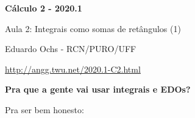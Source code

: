 \documentclass[oneside,12pt]{article}
\begin{document}

\long{}
\long{}
\long{}
\long{}
\long{}
\long{}
\long{}
\long{}
\long{}
\long{}

\long{}
\long{}

\def\frown{\ensuremath{{=}{(}}}
\def\True {\mathbf{V}}
\def\False{\mathbf{F}}
\def\D    {\displaystyle}

\def\drafturl{http://angg.twu.net/LATEX/2020-1-C2.pdf}
\def\drafturl{http://angg.twu.net/2020.1-C2.html}
\def\draftfooter{\tiny \href{\drafturl}{\jobname{}} \ColorBrown{\shorttoday{} \hours}}



%

\thispagestyle{empty}

\begin{center}

\vspace*{1.2cm}

{\bf \Large Cálculo 2 - 2020.1}

\bsk

Aula 2: Integrais como somas de retângulos (1)

\bsk

Eduardo Ochs - RCN/PURO/UFF

\url{http://angg.twu.net/2020.1-C2.html}

\end{center}

\newpage

{\bf Pra que a gente vai usar integrais e EDOs?}

Pra ser bem honesto:
\end{document}
